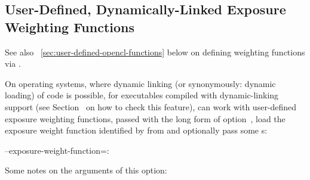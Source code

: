 

\subsection[User-Defined Dynamic Functions]{\label{sec:user-defined-dynlink-functions}%
  User-Defined, Dynamically-Linked Exposure Weighting Functions}

See also \sectionName~\ref{sec:user-defined-opencl-functions} below on defining weighting
functions via .


%
%
%
%
%
%
%
%
On operating systems, where dynamic linking (or synonymously: dynamic loading) of code is
possible, for \App{} executables compiled with dynamic-linking support (see
Section~ on how to check this feature), \App{} can work with
user-defined exposure weighting functions, passed with the long form of
option~, load the exposure weight function identified by
 from  and optionally pass some s:

\begin{literal}
  --exposure-weight-function=:\feasiblebreak
\end{literal}

Some notes on the arguments of this option:

